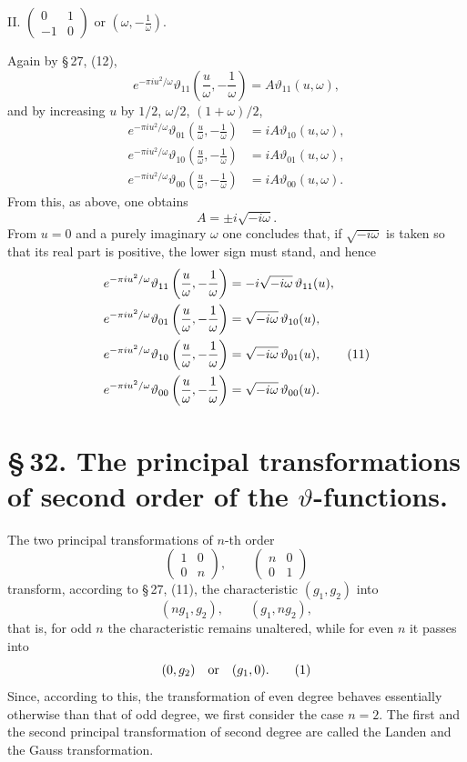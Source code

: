 \documentclass[11pt]{article}
\providecommand{\tht}{\vartheta}
\begin{document}
II. $\begin{pmatrix}0&1\\-1&0\end{pmatrix}$ or $\left(\omega,-\frac1\omega\right)$.

Again by \S\,27, (12),
\begin{equation}
e^{-\pi i u^2/\omega}\tht_{11}\left(\frac{u}{\omega},-\frac1\omega\right)
=A\tht_{11}(u,\omega), \tag{7}
\end{equation}
and by increasing $u$ by $1/2$, $\omega/2$, $(1+
\omega)/2$,
\begin{align}
e^{-\pi i u^2/\omega}\tht_{01}\left(\frac{u}{\omega},-\frac1\omega\right)&=iA\tht_{10}(u,\omega), \tag{8}\\
e^{-\pi i u^2/\omega}\tht_{10}\left(\frac{u}{\omega},-\frac1\omega\right)&=iA\tht_{01}(u,\omega), \tag{9}\\
e^{-\pi i u^2/\omega}\tht_{00}\left(\frac{u}{\omega},-\frac1\omega\right)&=iA\tht_{00}(u,\omega). \tag{10}
\end{align}
From this, as above, one obtains
\[
A=\pm i\sqrt{-i\omega}.
\]
From $u=0$ and a purely imaginary $\omega$ one concludes that, if $\sqrt{-i\omega}$ is taken so that its real part is positive, the lower sign must stand, and hence
\begin{align}
e^{-\pi i u^2/\omega}\tht_{11}\left(\frac{u}{\omega},-\frac1\omega\right)&=-i\sqrt{-i\omega}\,\tht_{11}(u),\notag\\
e^{-\pi i u^2/\omega}\tht_{01}\left(\frac{u}{\omega},-\frac1\omega\right)&=\sqrt{-i\omega}\,\tht_{10}(u),\notag\\
e^{-\pi i u^2/\omega}\tht_{10}\left(\frac{u}{\omega},-\frac1\omega\right)&=\sqrt{-i\omega}\,\tht_{01}(u), \tag{11}\\
e^{-\pi i u^2/\omega}\tht_{00}\left(\frac{u}{\omega},-\frac1\omega\right)&=\sqrt{-i\omega}\,\tht_{00}(u).\notag
\end{align}




\section*{\S\,32. The principal transformations of second order of the $\vartheta$-functions.}

The two principal transformations of $n$-th order
\[
\begin{pmatrix}1&0\\0&n\end{pmatrix},
\qquad
\begin{pmatrix}n&0\\0&1\end{pmatrix}
\]
transform, according to \S\,27, (11), the characteristic $(g_1,g_2)$ into
\[
(ng_1,g_2),\qquad (g_1,ng_2),
\]
that is, for odd $n$ the characteristic remains unaltered, while for even $n$ it passes into
\begin{equation}
(0,g_2)\quad\hbox{or}\quad(g_1,0). \tag{1}
\end{equation}
Since, according to this, the transformation of even degree behaves essentially otherwise than that of odd degree, we first consider the case $n=2$. The first and the second principal transformation of second degree are called the Landen and the Gauss transformation.
\end{document}
